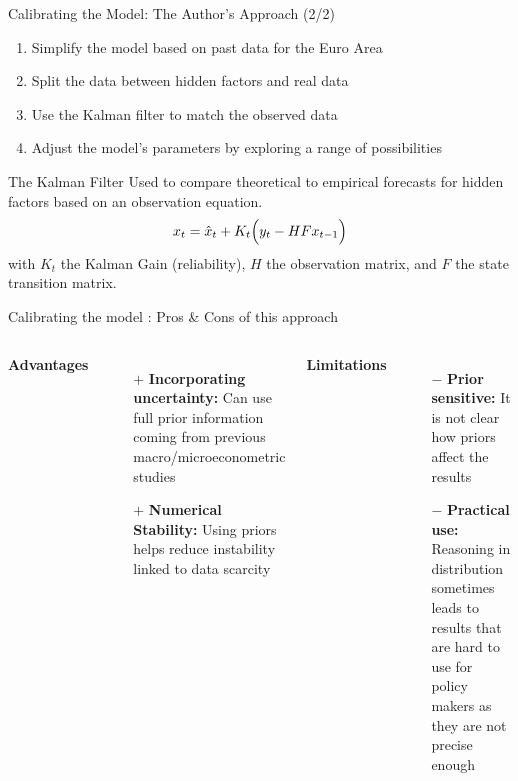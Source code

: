 \documentclass{beamer}
\begin{document}
\begin{frame}{Calibrating the Model: The Author's Approach (2/2)} 
\small{
\begin{enumerate}
    \item Simplify the model based on past data for the Euro Area
    \item Split the data between hidden  factors and real data
    \item Use the Kalman filter to match the observed data
    \item Adjust the model’s parameters by exploring a range of possibilities
\end{enumerate}}
{\small 
\begin{simplebox}{The Kalman Filter}  
Used to compare theoretical to empirical forecasts for hidden factors based on an observation equation.\\  {\normalsize\bfseries  
$$x_t=\hat{x}_t+K_t\Bigl(y_t-H F x_{t-1}\Bigr)$$  
}  
with $K_t$ the Kalman Gain (reliability), $H$ the observation matrix, and $F$ the state transition matrix.  
\end{simplebox}  
}  
\end{frame}  

\begin{frame}{Calibrating the model : Pros \& Cons of this approach}   
  \begin{columns}[T]    
      \centering    
      \textcolor{green!60!black}{{\Large\bfseries Advantages}}\\[0.5em]    
      \begin{itemize}\setlength{\itemsep}{1em}    
          \item[\textcolor{green!60!black}{\large$\mathbf{+}$}] \normalsize \textbf{Incorporating uncertainty:} Can use full prior information coming from previous macro/microeconometric studies  
          \item[\textcolor{green!60!black}{\large$\mathbf{+}$}] \normalsize \textbf{Numerical Stability:} Using priors helps reduce instability linked to data scarcity     
      \end{itemize}    
          
      \centering    
      \textcolor{red!60!black}{{\Large\bfseries Limitations}}\\[0.5em]    
      \begin{itemize}\setlength{\itemsep}{1em}    
          \item[\textcolor{red!60!black}{\large$\mathbf{-}$}] \normalsize \textbf{Prior sensitive:} It is not clear how priors affect the results    
          \item[\textcolor{red!60!black}{\large$\mathbf{-}$}] \normalsize \textbf{Practical use:} Reasoning in distribution sometimes leads to results that are hard to use for policy makers as they are not precise enough  
      \end{itemize}    
  \end{columns}    
\end{frame}
\end{document}
